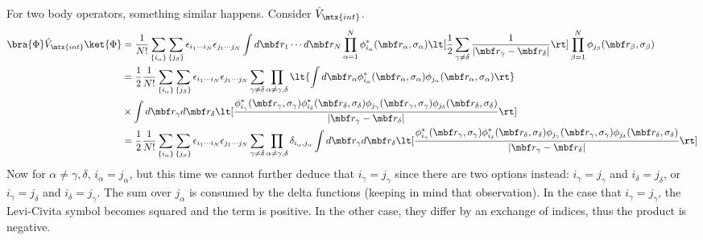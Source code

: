 \documentclass[10pt]{article}
\begin{document}
  For two body operators, something similar happens. Consider $\hat V_\mtx{int}$.
  \begin{align*}
    \bra{\Phi} \hat V_\mtx{int} \ket{\Phi}
    &=
    \frac{1}{N!} \sum_{\{i_\alpha\}} \sum_{\{j_\beta\}}
    \epsilon_{i_1 \cdots i_N} \epsilon_{j_1 \cdots j_N}
    \int d\mbf r_1 \cdots d\mbf r_N
    \prod_{\alpha=1}^N \phi_{i_\alpha}^*(\mbf r_\alpha, \sigma_\alpha)
    \lt[\frac 12 \sum_{\gamma \ne \delta} \frac 1{|\mbf r_\gamma - \mbf r_\delta|} \rt]
    \prod_{\beta=1}^N \phi_{j_\beta}(\mbf r_\beta, \sigma_\beta)
    \\
    &=
    \frac12 
    \frac{1}{N!} \sum_{\{i_\alpha\}} \sum_{\{j_\beta\}}
    \epsilon_{i_1 \cdots i_N} \epsilon_{j_1 \cdots j_N}
    \sum_{\gamma \ne \delta}
    \prod_{\alpha \ne \gamma,\delta}
    \lt\{
    \int d\mbf r_\alpha 
      \phi_{i_\alpha}^*(\mbf r_\alpha, \sigma_\alpha)
      \phi_{j_\alpha}(\mbf r_\alpha, \sigma_\alpha)
    \rt\}
    \\
    &\times
    \int d\mbf r_\gamma d\mbf r_\delta
    \lt[
    \frac 
    {
      \phi_{i_\gamma}^*(\mbf r_\gamma, \sigma_\gamma)
      \phi_{i_\delta}^*(\mbf r_\delta, \sigma_\delta)
      \phi_{j_\gamma}(\mbf r_\gamma, \sigma_\gamma)
      \phi_{j_\delta}(\mbf r_\delta, \sigma_\delta)
    }
    {|\mbf r_\gamma - \mbf r_\delta|} \rt]
    \\
    &=
    \frac12 
    \frac{1}{N!} \sum_{\{i_\alpha\}} \sum_{\{j_\beta\}}
    \epsilon_{i_1 \cdots i_N} \epsilon_{j_1 \cdots j_N}
    \sum_{\gamma \ne \delta}
    \prod_{\alpha \ne \gamma,\delta}
    \delta_{i_\alpha,j_\alpha}
    \int d\mbf r_\gamma d\mbf r_\delta
    \lt[
    \frac 
    {
      \phi_{i_\gamma}^*(\mbf r_\gamma, \sigma_\gamma)
      \phi_{i_\delta}^*(\mbf r_\delta, \sigma_\delta)
      \phi_{j_\gamma}(\mbf r_\gamma, \sigma_\gamma)
      \phi_{j_\delta}(\mbf r_\delta, \sigma_\delta)
    }
    {|\mbf r_\gamma - \mbf r_\delta|} \rt]
  \end{align*}
  Now for $\alpha \ne \gamma, \delta$, $i_\alpha = j_\alpha$, but this time we
  cannot further deduce that $i_\gamma = j_\gamma$ since there are two options
  instead: $i_\gamma = j_\gamma$ and $i_\delta = j_\delta$, or $i_\gamma =
  j_\delta$ and $i_\delta = j_\gamma$. The sum over $j_\alpha$ is consumed by the
  delta functions (keeping in mind that observation). In the case that $i_\gamma =
  j_\gamma$, the Levi-Civita symbol becomes squared and the term is positive. In
  the other case, they differ by an exchange of indices, thus the product is negative.
\end{document}
